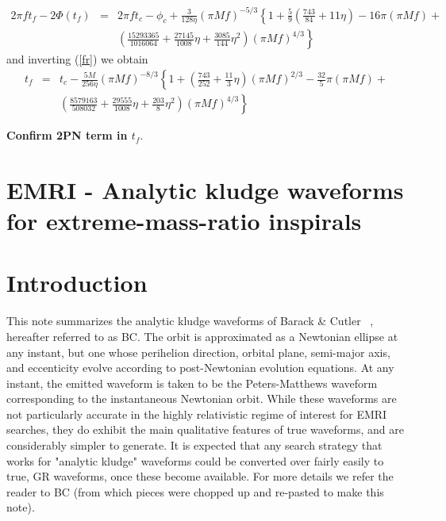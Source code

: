 \documentclass[11pt]{report}
\def\bea{\begin{eqnarray}}
\def\ena{\end{eqnarray}}
\begin{document}
\bea
2\pi ft_f - 2\Phi(t_f) &=& 2\pi ft_c - \phi_c + 
\frac3{128\eta}(\pi Mf)^{-5/3}\left\{ 
1 + \frac5{9}\left( \frac{743}{84} + 11\eta\right) - 16\pi
(\pi Mf) + \right.\nonumber\\
& & \left. \left( \frac{15293365}{1016064} + \frac{27145}{1008}\eta
+ \frac{3085}{144}\eta^2\right) (\pi Mf)^{4/3}
\right\} 
\ena
and inverting (\ref{fr}) we obtain
\bea
t_f  &=& t_c - \frac{5M}{256\eta}(\pi Mf)^{-8/3}\left\{
1 + \left( \frac{743}{252} + \frac{11}{3}\eta \right)(\pi Mf)^{2/3}
- \frac{32}{5}\pi (\pi Mf) + \right. \nonumber \\
& & \left. \left( \frac{8579163}{508032} + 
\frac{29555}{1008}\eta + \frac{203}{8}\eta^2\right) (\pi Mf)^{4/3}
\right\}
\ena

{\bf Confirm 2PN term in $t_f$}.

\section{EMRI - Analytic kludge waveforms for extreme-mass-ratio inspirals}


\section{Introduction}
This note summarizes the analytic kludge waveforms of Barack \& Cutler ~\cite{BC}, hereafter
referred to as BC.
The orbit is approximated as a Newtonian ellipse at any instant, but one whose
perihelion direction, orbital plane, semi-major axis, and eccenticity evolve 
according to post-Newtonian evolution equations.  At any instant, the emitted waveform
is taken to be the Peters-Matthews waveform corresponding to the instantaneous
Newtonian orbit.  While these waveforms are not particularly accurate in the
highly relativistic regime of interest for EMRI searches, they do exhibit the main qualitative
features of true waveforms, and are considerably simpler to generate.   It is expected that
any search strategy that works for "analytic kludge" waveforms could be converted over fairly
easily to true, GR waveforms, once these become available.
For more details we refer the reader to  BC (from which pieces were chopped up and
re-pasted to make this note).
\end{document}
